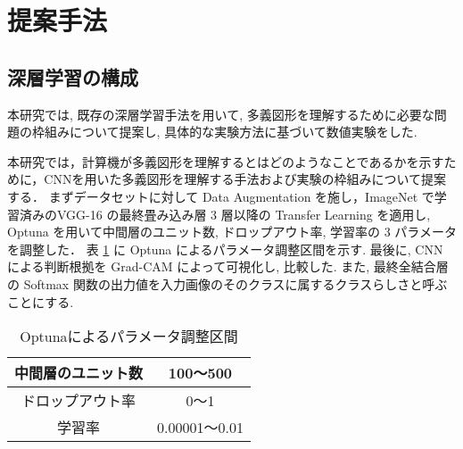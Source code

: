 \documentclass[twocolumn]{jarticle}     %
\newcommand{\1}{\mbox{1}\hspace{-0.25em}\mbox{l}}
\begin{document}
\section{提案手法}
\label{sec:proposed}
\subsection{深層学習の構成}
本研究では, 既存の深層学習手法を用いて, 多義図形を理解するために必要な問題の枠組みについて提案し, 具体的な実験方法に基づいて数値実験をした.\par
本研究では，計算機が多義図形を理解するとはどのようなことであるかを示すために，CNNを用いた多義図形を理解する手法および実験の枠組みについて提案する．
まずデータセットに対して Data Augmentation を施し，ImageNet で学習済みのVGG-16 の最終畳み込み層 3 層以降の Transfer Learning を適用し, Optuna を用いて中間層のユニット数, ドロップアウト率, 学習率の 3 パラメータを調整した．
表 \ref{tab:optuna} に Optuna によるパラメータ調整区間を示す.
最後に, CNN による判断根拠を Grad-CAM によって可視化し, 比較した. また, 最終全結合層の Softmax 関数の出力値を入力画像のそのクラスに属するクラスらしさと呼ぶことにする. 

\begin{table}[t]
	\begin{center}
		\caption{Optunaによるパラメータ調整区間}
		\label{tab:optuna}
		\begin{tabular}{|c|c|} \hline
			中間層のユニット数&100～500\\ \hline
			ドロップアウト率&0～1\\ \hline
			学習率&0.00001～0.01\\ \hline
		\end{tabular}
	\end{center}
\end{table}
\end{document}
